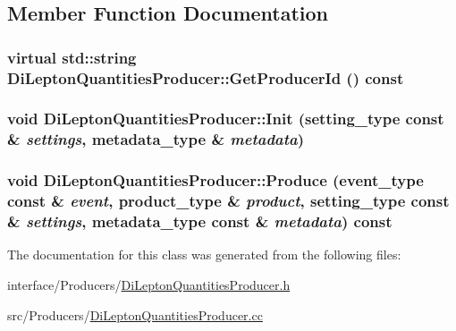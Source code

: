 \subsection{Member Function Documentation}
\hypertarget{classDiLeptonQuantitiesProducer_a8c3bfed3b572d274df239ecfbc9eede6}{
\subsubsection[{GetProducerId}]{\setlength{\rightskip}{0pt plus 5cm}virtual std::string DiLeptonQuantitiesProducer::GetProducerId () const}}
\label{classDiLeptonQuantitiesProducer_a8c3bfed3b572d274df239ecfbc9eede6}
\hypertarget{classDiLeptonQuantitiesProducer_a7dfd5d81a2fd37836ad99b1589e48981}{
\subsubsection[{Init}]{\setlength{\rightskip}{0pt plus 5cm}void DiLeptonQuantitiesProducer::Init (setting\_\-type const \& {\em settings}, \/  metadata\_\-type \& {\em metadata})}}
\label{classDiLeptonQuantitiesProducer_a7dfd5d81a2fd37836ad99b1589e48981}
\hypertarget{classDiLeptonQuantitiesProducer_a595a40c6aa24166f1b5703ce632586f6}{
\subsubsection[{Produce}]{\setlength{\rightskip}{0pt plus 5cm}void DiLeptonQuantitiesProducer::Produce (event\_\-type const \& {\em event}, \/  product\_\-type \& {\em product}, \/  setting\_\-type const \& {\em settings}, \/  metadata\_\-type const \& {\em metadata}) const}}
\label{classDiLeptonQuantitiesProducer_a595a40c6aa24166f1b5703ce632586f6}


The documentation for this class was generated from the following files:\begin{DoxyCompactItemize}
\item 
interface/Producers/\hyperlink{DiLeptonQuantitiesProducer_8h}{DiLeptonQuantitiesProducer.h}\item 
src/Producers/\hyperlink{DiLeptonQuantitiesProducer_8cc}{DiLeptonQuantitiesProducer.cc}\end{DoxyCompactItemize}
